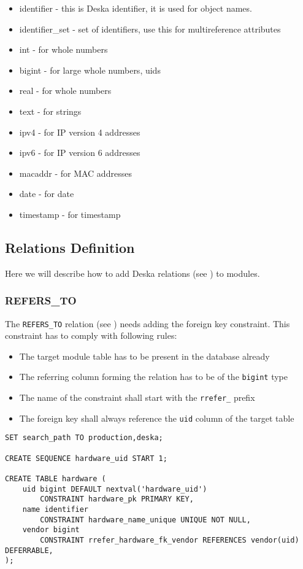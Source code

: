 \documentclass[deska]{subfiles}
\begin{document}
\begin{itemize}
	\item{identifier} - this is Deska identifier, it is used for object names.
	\item{identifier\_set} - set of identifiers, use this for multireference attributes
	\item{int} - for whole numbers
	\item{bigint} - for large whole numbers, uids
	\item{real} - for whole numbers
	\item{text} - for strings
	\item{ipv4} - for IP version 4 addresses
	\item{ipv6} - for IP version 6 addresses
	\item{macaddr} - for MAC addresses
	\item{date} - for date
	\item{timestamp} - for timestamp
\end{itemize}

\subsection{Relations Definition}
Here we will describe how to add Deska relations (see ) to modules.

\subsubsection{REFERS\_TO}
\label{sec:db-scheme-refers-to}

The {\tt REFERS\_TO} relation (see ) needs adding the foreign key constraint. This constraint has to comply with following rules:

\begin{itemize}
    \item The target module table has to be present in the database already
    \item The referring column forming the relation has to be of the {\tt bigint} type
    \item The name of the constraint shall start with the {\tt rrefer\_} prefix
    \item The foreign key shall always reference the {\tt uid} column of the target table
\end{itemize}

\begin{verbatim}
SET search_path TO production,deska;

CREATE SEQUENCE hardware_uid START 1;

CREATE TABLE hardware (
    uid bigint DEFAULT nextval('hardware_uid')
        CONSTRAINT hardware_pk PRIMARY KEY,
    name identifier
        CONSTRAINT hardware_name_unique UNIQUE NOT NULL,
    vendor bigint 
        CONSTRAINT rrefer_hardware_fk_vendor REFERENCES vendor(uid) DEFERRABLE,
);
\end{verbatim}
\end{document}

